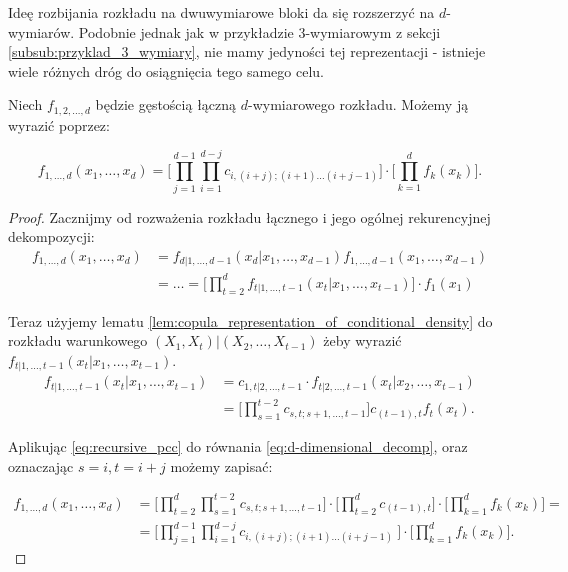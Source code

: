 Ideę rozbijania rozkładu na dwuwymiarowe bloki da się rozszerzyć na $d$-wymiarów. Podobnie jednak jak w przykładzie 3-wymiarowym z sekcji \ref{subsub:przyklad_3_wymiary}, nie mamy jedyności tej reprezentacji - istnieje wiele różnych dróg do osiągnięcia tego samego celu. 

\begin{thm}
	Niech $f_{1,2,\dots,d}$ będzie gęstością łączną $d$-wymiarowego rozkładu. Możemy ją wyrazić poprzez:
	
	\begin{equation}
		f_{1,\dots, d}(x_1, \dots, x_d) = \bigg[ \prod_{j=1}^{d-1} \prod_{i=1}^{d-j} c_{i, (i+j); (i+1)\dots(i+j-1)} \bigg] \cdot \bigg[ \prod_{k=1}^{d}f_k(x_k)\bigg].
		\label{eq:recursive_pcc}
	\end{equation}
\end{thm}
\begin{proof}
	Zacznijmy od rozważenia rozkładu łącznego i jego ogólnej rekurencyjnej dekompozycji:
\begin{equation}
	\begin{split}
		f_{1, \dots, d}(x_1, \dots, x_d) &= f_{d|1 , \dots, d-1}(x_d|x_1, \dots, x_{d-1})f_{1,\dots,d-1}(x_1, \dots, x_{d-1})\\
		&=\dots= \bigg[\prod_{t=2}^{d}f_{t|1,\dots,t-1}(x_t|x_1, \dots, x_{t-1})\bigg]\cdot f_1(x_1)
	\end{split}
	\label{eq:d-dimensional_decomp}
\end{equation}

Teraz użyjemy lematu \ref{lem:copula_representation_of_conditional_density} do rozkładu warunkowego $(X_1, X_t) | (X_2, \dots, X_{t-1})$ żeby wyrazić $f_{t|1,\dots,t-1}(x_t|x_1,\dots,x_{t-1})$.
	\begin{equation}
	\begin{split}
	f_{t|1,\dots,t-1}(x_t|x_1,\dots,x_{t-1})&= c_{1,t|2,\dots,t-1}\cdot f_{t|2,\dots,t-1}(x_t|x_2,\dots,x_{t-1})  \\
	& = \bigg[ \prod_{s=1}^{t-2} c_{s,t;s+1,\dots,t-1} \bigg] c_{(t-1), t} f_t(x_t).	
	\end{split}
	\end{equation}

Aplikując \ref{eq:recursive_pcc} do równania \ref{eq:d-dimensional_decomp}, oraz oznaczając $s=i, t=i+j$ możemy zapisać:

\begin{equation*}
	\begin{split}
		f_{1, \dots, d}(x_1, \dots, x_d) &= \bigg[\prod_{t=2}^{d}\prod_{s=1}^{t-2} c_{s,t;s+1,\dots,t-1}\bigg] \cdot \bigg[ \prod_{t=2}^{d}c_{(t-1), t} \bigg] \cdot \bigg[ \prod_{k=1}^{d}f_{k}(x_k) \bigg] = \\
		& = \bigg[\prod_{j=1}^{d-1}\prod_{i=1}^{d-j}c_{i,(i+j);(i+1)\dots(i+j-1)}\ \bigg] \cdot \bigg[\prod_{k=1}^{d}f_k(x_k)\bigg].
	\end{split}
\end{equation*}
\end{proof}

